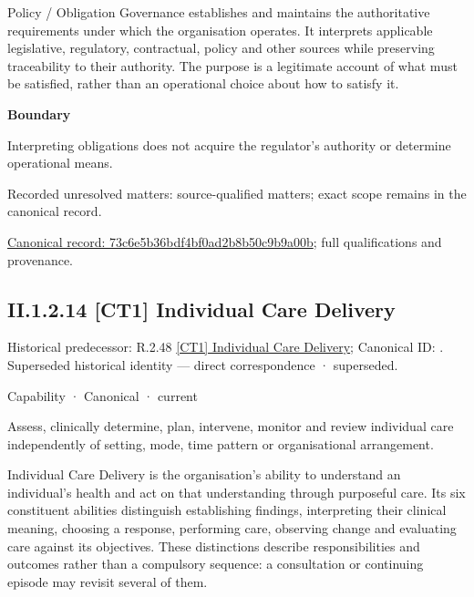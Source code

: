 Policy / Obligation Governance establishes and maintains the authoritative requirements under which the organisation operates. It interprets applicable legislative, regulatory, contractual, policy and other sources while preserving traceability to their authority. The purpose is a legitimate account of what must be satisfied, rather than an operational choice about how to satisfy it.



\textbf{Boundary}



Interpreting obligations does not acquire the regulator's authority or determine operational means.


{\small Recorded unresolved matters: source-qualified matters; exact scope remains in the canonical record.}\par
{\footnotesize \href{../../../../continuum/strategy/capability/73c6e5b36bdf4bf0ad2b8b50c9b9a00b.md}{Canonical record: 73c6e5b36bdf4bf0ad2b8b50c9b9a00b}; full qualifications and provenance.}\par
\subsection*{II.1.2.14 [CT1] Individual Care Delivery}
\label{navigation:II.1.2.14}

{\small Historical predecessor: R.2.48 \hyperref[element:162deb7e292042f78f677a14476a3a1d]{[CT1] Individual Care Delivery}; Canonical ID: \texttt{}. Superseded historical identity — direct correspondence · superseded.}\par
\label{element:b964a11cde594318aa14ff935414158a}
{\small Capability · Canonical · current}\par

Assess, clinically determine, plan, intervene, monitor and review individual care independently of setting, mode, time pattern or organisational arrangement.



Individual Care Delivery is the organisation's ability to understand an individual's health and act on that understanding through purposeful care. Its six constituent abilities distinguish establishing findings, interpreting their clinical meaning, choosing a response, performing care, observing change and evaluating care against its objectives. These distinctions describe responsibilities and outcomes rather than a compulsory sequence: a consultation or continuing episode may revisit several of them.



